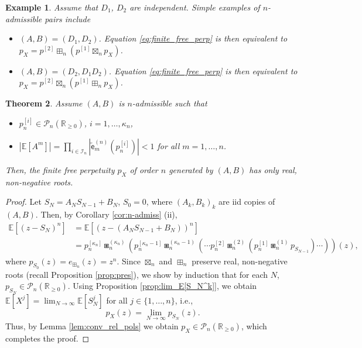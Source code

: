 \documentclass[a4paper,11pt]{amsart}
\numberwithin{equation}{section}
\newtheorem{theorem}{Theorem}[section]
\newtheorem{example}[theorem]{Example}
\newcommand{\E}{\mathbb{E}}
\newcommand{\R}{\mathbb{R}}
\newcommand{\pols}{\mathcal P}
\newcommand{\coef}[2]{\widetilde{\mathsf{e}}_{#1}^{(#2)}} %
\begin{document}
\begin{example}
Assume that $D_1$, $D_2$ are independent. 
Simple examples of \(n\)-admissible pairs include
\begin{itemize}
    \item $(A,B) = (D_1,D_2)$. Equation \eqref{eq:finite_free_perp} is then equivalent to $p_X = p^{[2]} \boxplus_n (p^{[1]} \boxtimes_n p_{X})$.
    \item $(A,B) = (D_2,D_1 D_2)$. Equation \eqref{eq:finite_free_perp} is then equivalent to $p_X = p^{[2]} \boxtimes_n  (p^{[1]} \boxplus_n p_{X})$.
\end{itemize}
\end{example}


\begin{theorem}\label{thm:rel_roots}
 Assume $(A,B)$ is $n$-admissible such that
 \begin{itemize}
 \item[(i)] $p_n^{[i]}\in\pols_n(\R_{\geq 0})$, $i=1,\ldots,\kappa_n$,
     \item[(ii)] $| \E[A^m]| = \prod_{i\in\mathcal{I}_n} | \coef{m}{n}(p_{n}^{[i]})|<1$ for all $m=1,\ldots,n$. 
 \end{itemize}
 Then, the finite free perpetuity $p_X$ of order $n$ generated by $(A,B)$ has only real, non-negative roots. 
\end{theorem}

\begin{proof}
Let $S_N = A_N S_{N-1}+B_N$, $S_0=0$, where $(A_k,B_k)_k$ are iid copies of $(A,B)$. Then, by Corollary \ref{cor:n-admiss} (ii),
\begin{align*}
 \E[ (z-S_N)^n] &=  \E[(z-(A_N S_{N-1}+B_N))^n] \\
&= p_{n}^{[\kappa_n]}\boxast_n^{(\kappa_n)} \left( p_{n}^{[\kappa_n-1]}\boxast_n^{(\kappa_n-1)}\left(\cdots p_n^{[2]}\boxast_n^{(2)}\left( p_{n}^{[1]}\boxast_n^{(1)} p_{S_{N-1}}\right)\cdots \right)\right) (z),
\end{align*}
where $p_{S_0}(z) = e_{\boxplus_n}(z) = z^n$.
Since  $\boxtimes_n$ and $\boxplus_n$ preserve real, non-negative roots (recall Proposition \ref{prop:pres}), we show by induction that for each $N$, $p_{S_N}\in \pols_{n}(\R_{\geq 0})$.
Using Proposition \ref{prop:lim_E[S_N^k]}, we obtain $\E[X^j] = \lim_{N\to\infty}\E[S_N^j]$ for all $j\in\{1,\dots,n\}$, i.e.,
\[
p_X(z) = \lim_{N\to\infty} p_{S_N}(z).
\]
Thus, by Lemma \ref{lem:conv_rel_pols} we obtain $p_X \in \pols_{n}(\R_{\geq 0})$, which completes the proof.
\end{proof}
\end{document}
